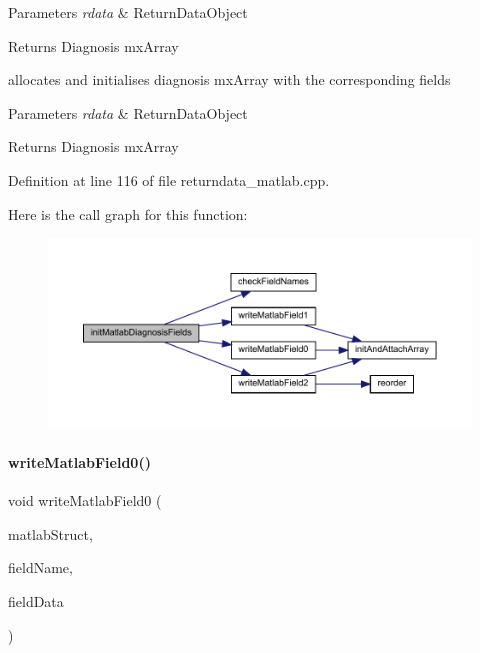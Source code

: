 \begin{DoxyParams}{Parameters}
{\em rdata} & Return\+Data\+Object\\
\hline
\end{DoxyParams}
\begin{DoxyReturn}{Returns}
Diagnosis mx\+Array
\end{DoxyReturn}
allocates and initialises diagnosis mx\+Array with the corresponding fields


\begin{DoxyParams}{Parameters}
{\em rdata} & Return\+Data\+Object\\
\hline
\end{DoxyParams}
\begin{DoxyReturn}{Returns}
Diagnosis mx\+Array
\end{DoxyReturn}


Definition at line 116 of file returndata\+\_\+matlab.\+cpp.

Here is the call graph for this function\+:
\nopagebreak
\begin{figure}[H]
\begin{center}
\leavevmode
\includegraphics[width=350pt]{namespaceamici_aa12d4917fed647a1edeaaa26a261c770_cgraph}
\end{center}
\end{figure}
\mbox{\label{namespaceamici_ad2949f3931c6fac6fd12fd7ede47ac30}} 
\paragraph{\texorpdfstring{write\+Matlab\+Field0()}{writeMatlabField0()}}
{\footnotesize\ttfamily void write\+Matlab\+Field0 (\begin{DoxyParamCaption}\item[{mx\+Array $\ast$}]{matlab\+Struct,  }\item[{const char $\ast$}]{field\+Name,  }\item[{T}]{field\+Data }\end{DoxyParamCaption})}

